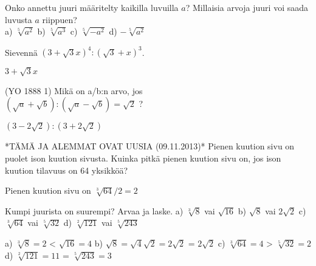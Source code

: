 \begin{tehtavasivu}
\begin{tehtava}
Onko annettu juuri määritelty kaikilla luvuilla $a$? Millaisia arvoja juuri voi saada luvusta $a$ riippuen?\\
a) $\sqrt[5]{a^2}$ \quad b) $\sqrt[5]{a^3}$ \quad c) $\sqrt[5]{-a^2}$ \quad d) $- \sqrt[5]{a^2}$

\begin{vastaus}

\begin{alakohdat}
\end{alakohdat}
\end{vastaus}
\end{tehtava}

\begin{tehtava}
Sievennä $(3+\sqrt{3}x)^4:(\sqrt{3}+x)^3$.
\begin{vastaus}
$3 + \sqrt{3}x$
\end{vastaus}
\end{tehtava}

\begin{tehtava}
(YO 1888 1) Mikä on a/b:n arvo, jos \\
$ (\sqrt{a}+\sqrt{b}):(\sqrt{a}-\sqrt{b})=\sqrt{2}$ ?
\begin{vastaus}
$(3-2\sqrt{2}):(3+2\sqrt{2})$
\end{vastaus}
\end{tehtava}

\begin{tehtava}
*TÄMÄ JA ALEMMAT OVAT UUSIA (09.11.2013)*  Pienen kuution sivu on puolet ison kuution sivusta. Kuinka pitkä pienen kuution sivu on, jos ison kuution tilavuus on 64 yksikköä? \\
\begin{vastaus}
Pienen kuution sivu on $\sqrt[3]{64}/2=2$ 
\end{vastaus}
\end{tehtava}

\begin{tehtava} Kumpi juurista on suurempi? Arvaa ja laske.
a) $\sqrt[3]{8}$ vai $\sqrt{16}$ \quad b)  $\sqrt{8}$ vai $2\sqrt{2}$  \quad c) $\sqrt[3]{64}$ vai $\sqrt[5]{32}$ \quad d) $\sqrt[2]{121}$ vai $\sqrt[5]{243}$ 
\begin{vastaus}
a) $\sqrt[3]{8}=2$   <   $\sqrt{16}=4$ \quad b) $\sqrt{8}=\sqrt{4}\sqrt{2}=2\sqrt{2}$ \quad = \quad $2\sqrt{2}$ \quad c) $\sqrt[3]{64}=4$   >   $\sqrt[5]{32}=2$ \quad d) $\sqrt[2]{121}=11$ \quad  = \quad $\sqrt[5]{243}=3$ 
\end{vastaus}
\end{tehtava}


\end{tehtavasivu}
